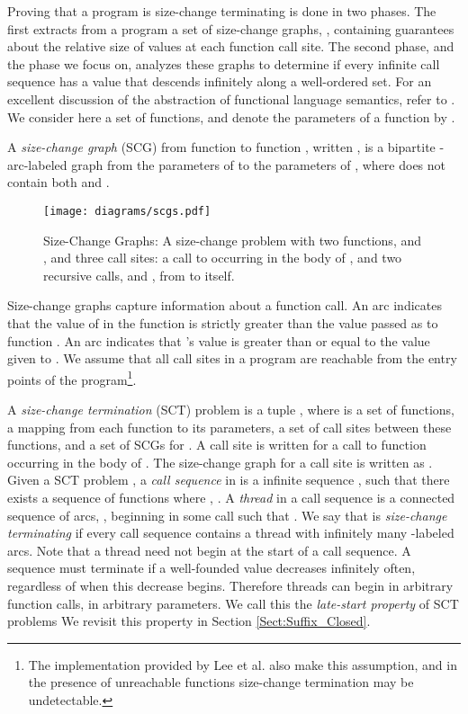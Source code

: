 \documentclass{LMCS}
\begin{document}
Proving that a program is size-change terminating is done in two phases. The
first extracts from a program a set of size-change graphs, , containing
guarantees about the relative size of values at each function call site. The
second phase, and the phase we focus on, analyzes these graphs to determine if
every infinite call sequence has a value that descends infinitely along a
well-ordered set. For an excellent discussion of the abstraction of functional
language semantics, refer to \cite{JB04}.  We consider here a set  of
functions, and denote the parameters of a function  by .

\begin{defi}
A \emph{size-change graph} (SCG) from function  to function , written
, is a bipartite -arc-labeled graph from
the parameters of  to the parameters of  , where  does not contain both  and .
\end{defi}

\begin{figure}[tb]
\begin{center}
{\texttt{[image: diagrams/scgs.pdf]}}
\end{center}
\caption{Size-Change Graphs: A size-change problem with two functions,  and , and three call
sites: a call  to  occurring in the body of , and two recursive calls,  and , from  to itself.}\label{fig:scg}
\end{figure}

Size-change graphs capture information about a function call. An arc  indicates that the value of  in the function  is strictly
greater than the value passed as  to function .  An arc 
indicates that 's value is greater than or equal to the value given to .
We assume that all call sites in a program are reachable from the entry points of the
program\footnote{The implementation provided by Lee et al.
\cite{LJB01} also make this assumption, and in the presence of unreachable
functions size-change termination may be undetectable.}.

A \emph{size-change termination} (SCT) problem is a tuple , where  is a set
of functions,  a mapping from each function to its parameters,  a set of call sites between
these functions, and  a set of SCGs for .  A call site is written 
for a call to function  occurring in the body of .  The size-change graph for a call site
 is written as . Given a SCT problem , a \emph{call sequence} in
 is a infinite sequence , such that there exists a sequence of
functions  where , .  A
\emph{thread} in a call sequence  is a connected sequence of arcs, , beginning in some call  such that .  We say that  is \emph{size-change terminating} if every
call sequence contains a thread with infinitely many -labeled arcs.  Note that a thread need not
begin at the start of a call sequence. A sequence must terminate if a well-founded value decreases
infinitely often, regardless of when this decrease begins. Therefore threads can begin in arbitrary
function calls, in arbitrary parameters. We call this the \emph{late-start property} of SCT
problems We revisit this property in Section \ref{Sect:Suffix_Closed}.
\end{document}
